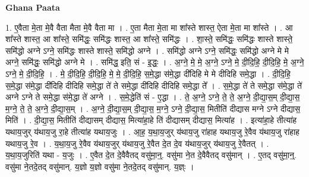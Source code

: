\documentclass[17pt]{extarticle}
\begin{document}
\textbf{Ghana Paata } \newline

1. ए॒वैता मे॒ता मे॒वै वैता मैता मे॒वै वैता मा । . ए॒ता मैता मे॒ता मा शा᳚स्ते शास्त॒ ऐता मे॒ता मा शा᳚स्ते । . आ शा᳚स्ते शास्त॒ आ शा᳚स्ते॒ समि॑द्धः॒ समि॑द्धः शास्त॒ आ शा᳚स्ते॒ समि॑द्धः । . शा॒स्ते॒ समि॑द्धः॒ समि॑द्धः शास्ते शास्ते॒ समि॑द्धो अग्ने ऽग्ने॒ समि॑द्धः शास्ते शास्ते॒ समि॑द्धो अग्ने । . समि॑द्धो अग्ने ऽग्ने॒ समि॑द्धः॒ समि॑द्धो अग्ने मे मे अग्ने॒ समि॑द्धः॒ समि॑द्धो अग्ने मे । . समि॑द्ध॒ इति॒ सं - इ॒द्धः॒ । . अ॒ग्ने॒ मे॒ मे॒ अ॒ग्ने॒ ऽग्ने॒ मे॒ दी॒दि॒हि॒ दी॒दि॒हि॒ मे॒ अ॒ग्ने॒ ऽग्ने॒ मे॒ दी॒दि॒हि॒ । . मे॒ दी॒दि॒हि॒ दी॒दि॒हि॒ मे॒ मे॒ दी॒दि॒हि॒ स॒मे॒द्धा स॑मे॒द्धा दी॑दिहि मे मे दीदिहि समे॒द्धा । . दी॒दि॒हि॒ स॒मे॒द्धा स॑मे॒द्धा दी॑दिहि दीदिहि समे॒द्धा ते॑ ते समे॒द्धा दी॑दिहि दीदिहि समे॒द्धा ते᳚ । . स॒मे॒द्धा ते॑ ते समे॒द्धा स॑मे॒द्धा ते॑ अग्ने ऽग्ने ते समे॒द्धा स॑मे॒द्धा ते॑ अग्ने । . स॒मे॒द्धेति॑ सं - ए॒द्धा । . ते॒ अ॒ग्ने॒ ऽग्ने॒ ते॒ ते॒ अ॒ग्ने॒ दी॒द्या॒स॒म् दी॒द्या॒स॒ म॒ग्ने॒ ते॒ ते॒ अ॒ग्ने॒ दी॒द्या॒स॒म् । . अ॒ग्ने॒ दी॒द्या॒स॒म् दी॒द्या॒स॒ म॒ग्ने॒ ऽग्ने॒ दी॒द्या॒स॒ मितीति॑ दीद्यास मग्ने ऽग्ने दीद्यास॒ मिति॑ । . दी॒द्या॒स॒ मितीति॑ दीद्यासम् दीद्यास॒ मित्या॑हा॒हे ति॑ दीद्यासम् दीद्यास॒ मित्या॑ह । . इत्या॑हा॒हे तीत्या॑ह यथाय॒जुर् य॑थाय॒जु रा॒हे तीत्या॑ह यथाय॒जुः । . आ॒ह॒ य॒था॒य॒जुर् य॑थाय॒जु रा॑हाह यथाय॒जु रे॒वैव य॑थाय॒जु रा॑हाह यथाय॒जु रे॒व । . य॒था॒य॒जु रे॒वैव य॑थाय॒जुर् य॑थाय॒जु रे॒वैत दे॒त दे॒व य॑थाय॒जुर् य॑थाय॒जु रे॒वैतत् । . य॒था॒य॒जुरिति॑ यथा - य॒जुः । . ए॒वैत दे॒त दे॒वैवैतद् वसु॑मा॒न्॒. वसु॑मा ने॒त दे॒वैवैतद् वसु॑मान् । . ए॒तद् वसु॑मा॒न्॒. वसु॑मा ने॒तदे॒तद् वसु॑मान्. य॒ज्ञो य॒ज्ञो वसु॑मा ने॒तदे॒तद् वसु॑मान्. य॒ज्ञ्ः । \newline
\end{document}
